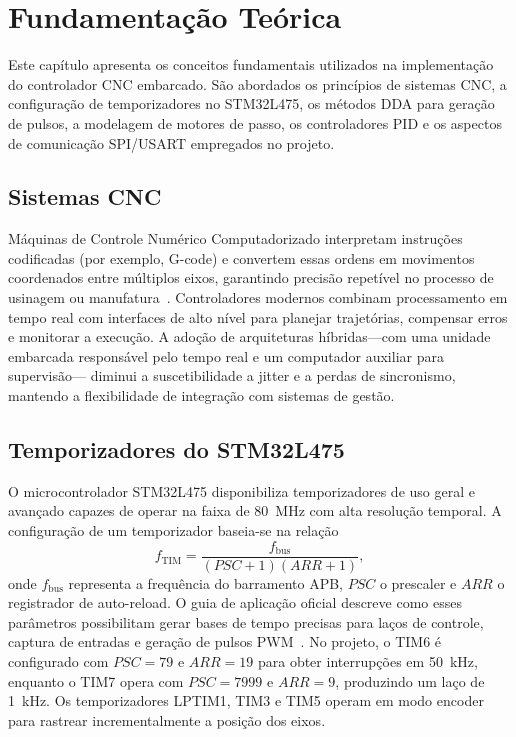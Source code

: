 \chapter{Fundamentação Teórica}\label{cap:fundamentacao}

Este capítulo apresenta os conceitos fundamentais utilizados na
implementação do controlador CNC embarcado. São abordados os princípios
de sistemas CNC, a configuração de temporizadores no STM32L475, os
métodos DDA para geração de pulsos, a modelagem de motores de passo,
os controladores PID e os aspectos de comunicação SPI/USART empregados no
projeto.

\section{Sistemas CNC}

Máquinas de Controle Numérico Computadorizado interpretam instruções
codificadas (por exemplo, G-code) e convertem essas ordens em movimentos
coordenados entre múltiplos eixos, garantindo precisão repetível no
processo de usinagem ou manufatura~\cite{groover2015}. Controladores
modernos combinam processamento em tempo real com interfaces de alto
nível para planejar trajetórias, compensar erros e monitorar a execução.
A adoção de arquiteturas híbridas---com uma unidade embarcada
responsável pelo tempo real e um computador auxiliar para supervisão---
diminui a suscetibilidade a jitter e a perdas de sincronismo, mantendo a
flexibilidade de integração com sistemas de gestão.

\section{Temporizadores do STM32L475}

O microcontrolador STM32L475 disponibiliza temporizadores de uso geral e
avançado capazes de operar na faixa de \SI{80}{\mega\hertz} com alta
resolução temporal. A configuração de um temporizador baseia-se na
relação
\begin{equation}
    f_{\text{TIM}} = \frac{f_{\text{bus}}}{(PSC+1)(ARR+1)},
\end{equation}
onde $f_{\text{bus}}$ representa a frequência do barramento APB, $PSC$ o
prescaler e $ARR$ o registrador de auto-reload. O guia de aplicação
oficial descreve como esses parâmetros possibilitam gerar bases de tempo
precisas para laços de controle, captura de entradas e geração de pulsos
PWM~\cite{st_an4013}. No projeto, o TIM6 é configurado com
$PSC = 79$ e $ARR = 19$ para obter interrupções em \SI{50}{\kilo\hertz},
enquanto o TIM7 opera com $PSC = 7999$ e $ARR = 9$, produzindo um laço
de \SI{1}{\kilo\hertz}. Os temporizadores LPTIM1, TIM3 e TIM5 operam em
modo encoder para rastrear incrementalmente a posição dos eixos.


